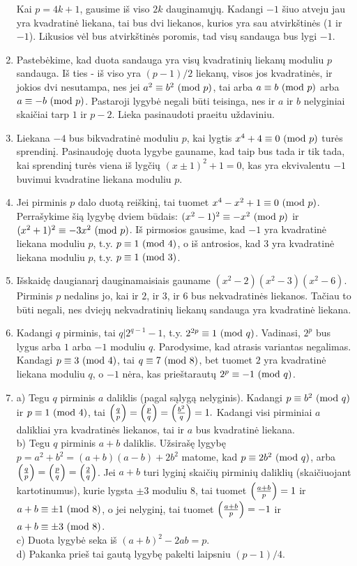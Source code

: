 \begin{enumerate}
Kai $p=4k+1$, gausime iš viso $2k$ dauginamųjų. Kadangi $-1$ šiuo
atveju jau yra kvadratinė liekana, tai bus dvi liekanos, kurios yra
sau atvirkštinės ($1$ ir $-1$). Likusios vėl bus atvirkštinės poromis,
tad visų sandauga bus lygi $-1$.
\item 
Pastebėkime, kad duota sandauga yra visų kvadratinių liekanų moduliu
$p$ sandauga. Iš ties - iš viso yra $(p-1)/2$ liekanų, visos jos
kvadratinės, ir jokios dvi nesutampa, nes jei $a^2 \equiv b^2 \ (\text{mod } p)$,
tai arba $a\equiv b\ (\text{mod } p)$ arba $a\equiv -b\ (\text{mod } p)$. Pastaroji lygybė
negali būti teisinga, nes ir $a$ ir $b$ nelyginiai skaičiai tarp $1$
ir $p-2$. Lieka pasinaudoti praeitu uždaviniu.
\item 
Liekana $-4$ bus bikvadratinė moduliu $p$, kai lygtis $x^4 + 4 \equiv
0 \ (\text{mod } p)$ turės sprendinį. Pasinaudoję duota lygybe gauname, kad taip
bus tada ir tik tada, kai sprendinį turės viena iš lygčių $(x\pm1)^2 +
1=0$, kas yra ekvivalentu $-1$ buvimui kvadratine liekana moduliu $p$. 
\item 
Jei pirminis $p$ dalo duotą reiškinį, tai tuomet $x^4 - x^2 + 1
\equiv 0 \ (\text{mod } p)$. Perrašykime šią lygybę dviem būdais: $(x^2-1)^2\equiv
-x^2\ (\text{mod } p)$ ir $(x^2+1)^2 \equiv -3x^2\ (\text{mod } p)$. Iš pirmosios gausime, kad
$-1$ yra kvadratinė liekana moduliu $p$, t.y. $p \equiv 1\ (\text{mod } 4)$, o iš
antrosios, kad $3$ yra kvadratinė liekana moduliu $p$, t.y. $p \equiv
1\ (\text{mod } 3)$.
\item 
Išskaidę daugianarį dauginamaisiais gauname $(x^2 - 2)(x^2-3)(x^2-6).$
Pirminis $p$ nedalins jo, kai ir $2$, ir $3$, ir $6$ bus nekvadratinės
liekanos. Tačiau to būti negali, nes dviejų nekvadratinių liekanų
sandauga yra kvadratinė liekana.
\item 
Kadangi $q$ pirminis, tai $q|2^{q-1}-1$, t.y. $2^{2p}\equiv 1\ (\text{mod } q)$.
Vadinasi, $2^p$ bus lygus arba $1$ arba $-1$ moduliu $q$. Parodysime,
kad atrasis variantas negalimas. Kandagi $p\equiv 3\ (\text{mod } 4)$, tai
$q\equiv 7\ (\text{mod } 8)$, bet tuomet $2$ yra kvadratinė liekana moduliu
$q$, o $-1$ nėra, kas prieštarautų $2^p\equiv -1 \ (\text{mod } q)$. 
\item 
a) Tegu $q$ pirminis $a$ daliklis (pagal sąlygą
nelyginis). Kadangi $p \equiv b^2 \ (\text{mod } q)$ ir $p\equiv 1 \ (\text{mod } 4)$, tai
$\left(\frac{q}{p}\right)=\left(\frac{p}{q}\right)=\left(\frac{b^2}{q}\right)=1.$ Kadangi visi pirminiai $a$
dalikliai yra kvadratinės liekanos, tai ir $a$ bus kvadratinė
liekana.\\
b) Tegu $q$ pirminis $a+b$ daliklis. Užsirašę lygybę
$p=a^2+b^2 = (a+b)(a-b) +2b^2$ matome, kad $p\equiv 2b^2\ (\text{mod } q)$, arba
$\left(\frac{q}{p}\right)=\left(\frac{p}{q}\right)=\left(\frac{2}{q}\right)$. Jei $a+b$ turi lyginį skaičių
pirminių daliklių (skaičiuojant kartotinumus), kurie lygsta $\pm 3$
moduliu $8$, tai tuomet $\left(\frac{a+b}{p}\right)=1$ ir $a+b \equiv \pm 1
\ (\text{mod } 8)$, o jei nelyginį, tai tuomet $\left(\frac{a+b}{p}\right)=-1$ ir $a+b\equiv \pm
3\ (\text{mod } 8)$.\\
c) Duota lygybė seka iš $(a+b)^2 -2ab = p$.\\
d) Pakanka prieš tai gautą lygybę pakelti laipsniu $(p-1)/4$.


\end{enumerate}
